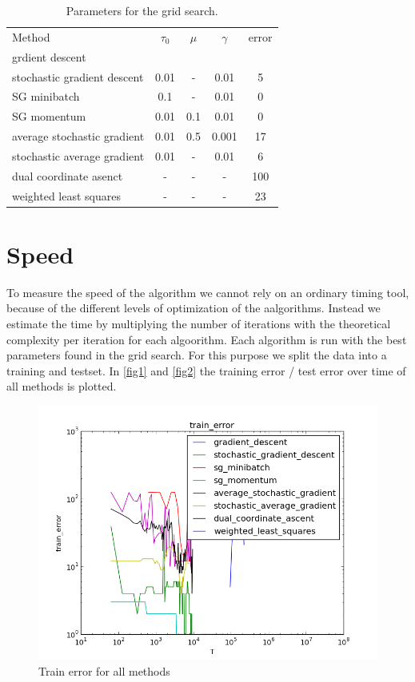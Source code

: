 \documentclass{article}
\begin{document}
\begin{table}[h]
	\centering
	\begin{tabular}{l c c c c}
		Method				& $\tau_0$ & $\mu$& $\gamma$ & error \\	
		grdient descent			&	   & 	  & &	\\
		stochastic gradient descent	& 0.01	   & - 	  & 0.01     & 5     \\
	 	SG minibatch 			& 0.1	   & -	  & 0.01     & 0     \\
		SG momentum			& 0.01	   & 0.1  & 0.01     & 0     \\
		average stochastic gradient	& 0.01     &0.5   & 0.001    & 17    \\	
		stochastic average gradient	& 0.01	   &  -   & 0.01     & 6     \\
		dual coordinate asenct		& -	   &  -   &   -	     & 100   \\
		weighted least squares		& -        &  -   &   -      & 23    \\
	\end{tabular}
	\caption{Parameters for the grid search.}
	\label{tab2}
\end{table}


\section{Speed}

To measure the speed of the algorithm we cannot rely on an ordinary timing tool, because of the different levels of optimization of the aalgorithms.
Instead we estimate the time by multiplying the number of iterations with the theoretical complexity per iteration for each algoorithm.
Each algorithm is run with the best parameters found in the grid search. For this purpose we split the data into a training and testset.
In \autoref{fig1} and \autoref{fig2} the training error / test error over time of all methods is plotted.

\begin{figure}[h]
	\centering
	\includegraphics[width = .8\textwidth]{../results/train_error.png}
	\caption{Train error for all methods}
	\label{fig1}
\end{figure}
\end{document}
